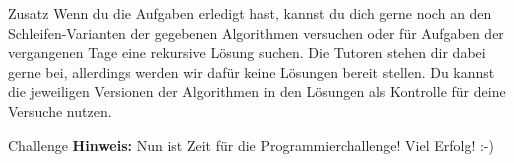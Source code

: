 \begin{task}[points=auto]{Zusatz}
    Wenn du die Aufgaben erledigt hast, kannst du dich gerne noch an den Schleifen-Varianten der gegebenen Algorithmen versuchen oder für Aufgaben der vergangenen Tage eine rekursive Lösung suchen. Die Tutoren stehen dir dabei gerne bei, allerdings werden wir dafür keine Lösungen bereit stellen. Du kannst die jeweiligen Versionen der Algorithmen in den Lösungen als Kontrolle für deine Versuche nutzen.
\end{task}
\begin{task}[points=auto]{Challenge}
    \large \textbf{Hinweis:} Nun ist Zeit für die Programmierchallenge! Viel Erfolg! :-)
\end{task}

